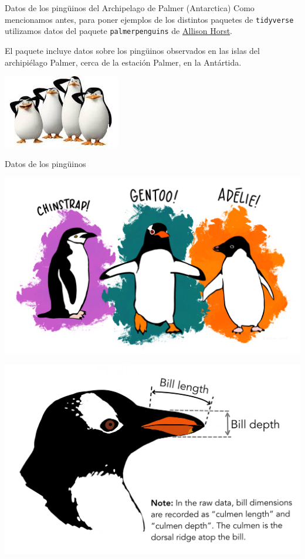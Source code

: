 \documentclass[
  ignorenonframetext,
  aspectratio=169]{beamer}
\begin{document}
\begin{frame}[fragile]{Datos de los pingüinos del Archipelago de Palmer
(Antarctica)}
\label{datos-de-los-pinguxfcinos-del-archipelago-de-palmer-antarctica}
Como mencionamos antes, para poner ejemplos de los distintos paquetes de
\texttt{tidyverse} utilizamos datos del paquete \texttt{palmerpenguins}
de \href{https://allisonhorst.github.io/palmerpenguins/}{Allison Horst}.

El paquete incluye datos sobre los pingüinos observados en las islas del
archipiélago Palmer, cerca de la estación Palmer, en la Antártida.

\begin{center}\includegraphics[width=0.3\linewidth]{Imgs/pinguinos_madagascar} \end{center}
\end{frame}

\begin{frame}{Datos de los pingüinos}
\label{datos-de-los-pinguxfcinos}
\begin{center}\includegraphics[width=0.35\linewidth]{Imgs/lter_penguins} \end{center}

\begin{center}\includegraphics[width=0.35\linewidth]{Imgs/culmen_depth} \end{center}
\end{frame}
\end{document}
